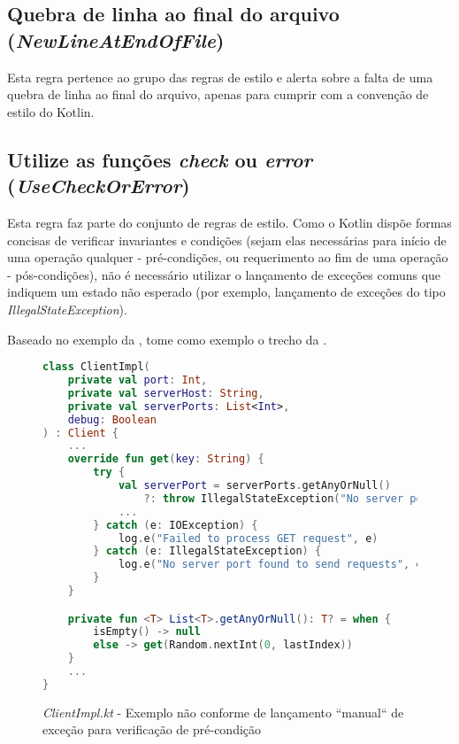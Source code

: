 \subsection{Quebra de linha ao final do arquivo (\textit{NewLineAtEndOfFile})}

Esta regra pertence ao grupo das regras de estilo \cite{detekt_new_line_at_end_of_file_rule} e alerta sobre a falta de uma quebra de linha ao final do arquivo, apenas para cumprir com a convenção de estilo do Kotlin.

\subsection{Utilize as funções \textit{check} ou \textit{error} (\textit{UseCheckOrError})}

Esta regra faz parte do conjunto de regras de estilo. Como o Kotlin dispõe formas concisas de verificar invariantes e condições (sejam elas necessárias para início de uma operação qualquer - pré-condições, ou requerimento ao fim de uma operação - pós-condições), não é necessário utilizar o lançamento de exceções comuns que indiquem um estado não esperado (por exemplo, lançamento de exceções do tipo \textit{IllegalStateException}).

Baseado no exemplo da , tome como exemplo o trecho da .

\begin{figure}[H]
    \centering
    \begin{lstlisting}[language=Kotlin]
class ClientImpl(
    private val port: Int,
    private val serverHost: String,
    private val serverPorts: List<Int>,
    debug: Boolean
) : Client {
    ...
    override fun get(key: String) {
        try {
            val serverPort = serverPorts.getAnyOrNull() 
                ?: throw IllegalStateException("No server port found to send request")
            ...
        } catch (e: IOException) {
            log.e("Failed to process GET request", e)
        } catch (e: IllegalStateException) {
            log.e("No server port found to send requests", e)
        }
    }

    private fun <T> List<T>.getAnyOrNull(): T? = when {
        isEmpty() -> null
        else -> get(Random.nextInt(0, lastIndex))
    }
    ...
}
    \end{lstlisting}
    \caption{\textit{ClientImpl.kt} - Exemplo não conforme de lançamento ``manual`` de exceção para verificação de pré-condição}
    \label{fig:detekt_use_error_or_check_before_example}
\end{figure}

